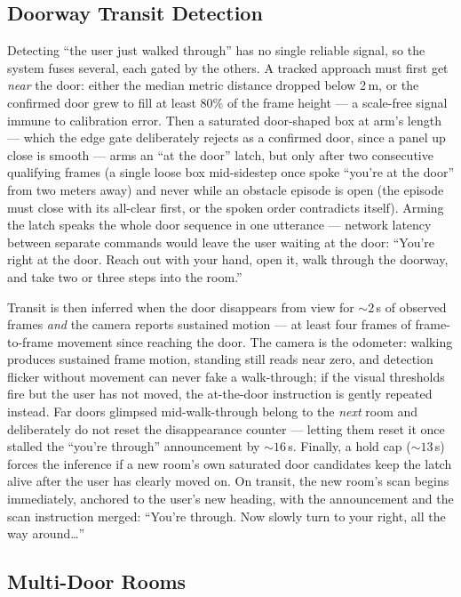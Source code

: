 \subsection{Doorway Transit Detection}
\label{sec:transit}

Detecting ``the user just walked through'' has no single reliable signal, so the
system fuses several, each gated by the others. A tracked approach must first get
\emph{near} the door: either the median metric distance dropped below 2\,m, or the
confirmed door grew to fill at least 80\% of the frame height --- a scale-free
signal immune to calibration error. Then a saturated door-shaped box at arm's
length --- which the edge gate deliberately rejects as a confirmed door, since a
panel up close is smooth --- arms an ``at the door'' latch, but only after two
consecutive qualifying frames (a single loose box mid-sidestep once spoke ``you're
at the door'' from two meters away) and never while an obstacle episode is open
(the episode must close with its all-clear first, or the spoken order contradicts
itself). Arming the latch speaks the whole door sequence in one utterance ---
network latency between separate commands would leave the user waiting at the
door: ``You're right at the door. Reach out with your hand, open it, walk through
the doorway, and take two or three steps into the room.''

Transit is then inferred when the door disappears from view for ${\sim}2$\,s of
observed frames \emph{and} the camera reports sustained motion --- at least four
frames of frame-to-frame movement since reaching the door. The camera is the
odometer: walking produces sustained frame motion, standing still reads near zero,
and detection flicker without movement can never fake a walk-through; if the
visual thresholds fire but the user has not moved, the at-the-door instruction is
gently repeated instead. Far doors glimpsed mid-walk-through belong to the
\emph{next} room and deliberately do not reset the disappearance counter ---
letting them reset it once stalled the ``you're through'' announcement by
${\sim}16$\,s. Finally, a hold cap (${\sim}13$\,s) forces the inference if a new
room's own saturated door candidates keep the latch alive after the user has
clearly moved on. On transit, the new room's scan begins immediately, anchored to
the user's new heading, with the announcement and the scan instruction merged:
``You're through. Now slowly turn to your right, all the way around\ldots''

\subsection{Multi-Door Rooms}
\label{sec:multi_door}


